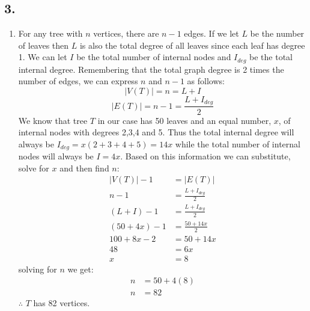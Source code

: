 \documentclass{article}
\begin{document}
    \subsection*{3.}
    \vspace*{10pt}
    \begin{enumerate}[label=(\alph*), left=10pt, itemsep=10pt]
        \item \begin{minipage}[t]{0.9\textwidth}
            For any tree with $n$ vertices, there are $n-1$ edges. If we let $L$ be the number
            of leaves then $L$ is also the total degree of all leaves since each leaf has
            degree 1. We can let $I$ be the total number of internal nodes and $I_{deg}$ be
            the total internal degree. Remembering that the total graph degree is 2 times
            the number of edges, we can express $n$ and $n-1$ as follows:
            \begin{equation}
                |V(T)| = n = L + I
            \end{equation}
            \begin{equation}
                |E(T)| = n-1 = \frac{L+I_{deg}}{2}
            \end{equation}
            We know that tree $T$ in our case has 50 leaves and an equal number, $x$, of internal
            nodes with degrees 2,3,4 and 5. Thus the total internal degree will always be
            $I_{deg}=x(2+3+4+5)=14x$ while the total number of internal nodes will always be
            $I=4x$. Based on this information we can substitute, solve for $x$ and then find $n$:
            \begin{align*}
                |V(T)|-1  &= |E(T)|\\
                n-1       &= \frac{L+I_{deg}}{2}\\
                (L + I)-1 &= \frac{L+I_{deg}}{2}\\
                (50+4x)-1 &= \frac{50 + 14x}{2}\\
                100+8x-2  &= 50+14x\\
                48        &= 6x\\
                x         &= 8
            \end{align*}
            solving for $n$ we get:
            \begin{align*}
                n &= 50 + 4(8)\\
                n &= 82
            \end{align*}
            $\therefore$ $T$ has 82 vertices.

        \end{minipage}
    \end{enumerate}
\end{document}
